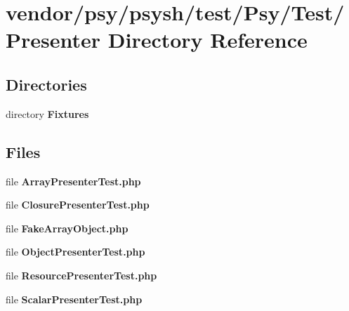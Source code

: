 \section{vendor/psy/psysh/test/\+Psy/\+Test/\+Presenter Directory Reference}
\label{dir_54c71f6b4327e741ea6c178534e088ab}
\subsection*{Directories}
\begin{DoxyCompactItemize}
\item 
directory {\bf Fixtures}
\end{DoxyCompactItemize}
\subsection*{Files}
\begin{DoxyCompactItemize}
\item 
file {\bf Array\+Presenter\+Test.\+php}
\item 
file {\bf Closure\+Presenter\+Test.\+php}
\item 
file {\bf Fake\+Array\+Object.\+php}
\item 
file {\bf Object\+Presenter\+Test.\+php}
\item 
file {\bf Resource\+Presenter\+Test.\+php}
\item 
file {\bf Scalar\+Presenter\+Test.\+php}
\end{DoxyCompactItemize}
